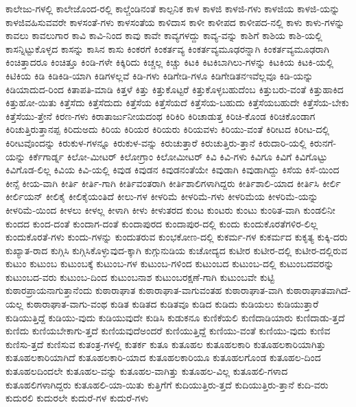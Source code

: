 {ಕಾಲೇಜು-ಗಳಲ್ಲಿ
ಕಾಲೇಜೊಂದ-ರಲ್ಲಿ
ಕಾಲ್ಚೆಂಡಿನಂತೆ
ಕಾಲ್ಪನಿಕ
ಕಾಳ
ಕಾಳಜಿ
ಕಾಳಜಿ-ಗಳು
ಕಾಳಜಿಯ
ಕಾಳಜಿ-ಯನ್ನು
ಕಾಳಜಿವಹಿಸುವವರೇ
ಕಾಳಸಂತೆ-ಗಳು
ಕಾಳಸಂತೆಯ
ಕಾಳಿದಾಸ
ಕಾಳೀ
ಕಾಳೀಪದ
ಕಾಳೀಪದ-ನಲ್ಲಿ
ಕಾಳು
ಕಾಳು-ಗಳನ್ನು
ಕಾವಲು
ಕಾವಲುಗಾರ
ಕಾವಿ
ಕಾವಿ-ನಿಂದ
ಕಾವು
ಕಾವೇ
ಕಾವ್ಯಗಳದ್ದು
ಕಾವ್ಯ-ವನ್ನು
ಕಾಶಿಗೆ
ಕಾಶಿಯ
ಕಾಶಿ-ಯಲ್ಲಿ
ಕಾಸನ್ನಿಟ್ಟುಕೊಳ್ಳದ
ಕಾಸನ್ನು
ಕಾಸಿನ
ಕಾಸು
ಕಿಂಕರಗೆ
ಕಿಂಕರ್ತವ್ಯ
ಕಿಂಕರ್ತವ್ಯಮೂಢರನ್ನಾಗಿ
ಕಿಂಕರ್ತವ್ಯಮೂಢರಾಗಿ
ಕಿಂಚಿತ್ತಾದರೂ
ಕಿಂಚಿತ್ತೂ
ಕಿಂಡಿ-ಗಳೇ
ಕಿಕ್ಕಿರಿದು
ಕಿಚ್ಚಲ್ಲ
ಕಿಚ್ಚು
ಕಿಟಕಿ
ಕಿಟಕಿಬಾಗಿಲು-ಗಳನ್ನು
ಕಿಟಕಿಯ
ಕಿಟಕಿ-ಯಲ್ಲಿ
ಕಿಟಿಕಿಯ
ಕಿಡಿ
ಕಿಡಿಕಿಡಿ-ಯಾಗಿ
ಕಿಡಿಗಳಲ್ಲವೆ
ಕಿಡಿ-ಗಳು
ಕಿಡಿಗೇಡಿ-ಗಳೂ
ಕಿಡಿಗೇಡಿತನಇವೆಲ್ಲವೂ
ಕಿಡಿ-ಯನ್ನು
ಕಿಡಿಯಾದುದ-ರಿಂದ
ಕಿತಾಪತಿ-ಮಾಡಿ
ಕಿತ್ತಳೆ
ಕಿತ್ತು
ಕಿತ್ತುಕೊಟ್ಟರೆ
ಕಿತ್ತುಕೊಳ್ಳಬಹುದೆಂಬ
ಕಿತ್ತುಬರು-ವಂತೆ
ಕಿತ್ತುಹಾಕಿದ
ಕಿತ್ತುಹೋ-ಯಿತು
ಕಿತ್ತೆಸೆದು
ಕಿತ್ತೆಸೆದುದು
ಕಿತ್ತೆಸೆಯ
ಕಿತ್ತೆಸೆಯದೆ
ಕಿತ್ತೆಸೆಯ-ಬಹುದು
ಕಿತ್ತೆಸೆಯಬಹುದೇ
ಕಿತ್ತೆಸೆಯ-ಬೇಕು
ಕಿತ್ತೆಸೆಯು-ತ್ತೇನೆ
ಕಿರಣ-ಗಳು
ಕಿರಾತಾರ್ಜುನೀಯದಂಥ
ಕಿರಿಕಿರಿ
ಕಿರಿಚಾಡುತ್ತ
ಕಿರಿಚಿ-ಕೊಂಡ
ಕಿರಿಚಿಕೊಂಡಾಗ
ಕಿರಿಚುತ್ತಿರುತ್ತಾನಪ್ಪ
ಕಿರಿದುಅದು
ಕಿರಿಯ
ಕಿರಿಯರ
ಕಿರಿಯರು
ಕಿರಿಯವಳು
ಕಿರಿಯು-ವಂತೆ
ಕಿರೀಟದ
ಕಿರೀಟ-ದಲ್ಲಿ
ಕಿರೀಟವೊಂದನ್ನು
ಕಿರುಕುಳ-ಗಳನ್ನೂ
ಕಿರುಕುಳ-ವನ್ನು
ಕಿರುಚುತ್ತಾರೆ
ಕಿರುಚುತ್ತಿರು-ತ್ತಾನೆ
ಕಿರುದಾರಿ-ಯಲ್ಲಿ
ಕಿರುನಗೆ-ಯನ್ನು
ಕಿರ್ಕೆಗಾರ್ಡ್ನ
ಕಿಲೋ-ಮೀಟರ್
ಕಿಲೋಗ್ರಾಂ
ಕಿಲೋಮೀಟರ್
ಕಿವಿ
ಕಿವಿ-ಗಳು
ಕಿವಿಗೂ
ಕಿವಿಗೆ
ಕಿವಿಗೊಟ್ಟು
ಕಿವಿಗೊಡ-ಲಿಲ್ಲ
ಕಿವಿಯ
ಕಿವಿ-ಯಲ್ಲಿ
ಕಿವುಡ
ಕಿವುಡನ
ಕಿವುಡನಂತೆಯೇ
ಕಿವುಡಾಗಿ
ಕಿವುಡಾಗಿದ್ದು
ಕಿಸೆಯ
ಕಿಸೆ-ಯಿಂದ
ಕೀನ್ಸೆ
ಕೀಯ-ವಾಗಿ
ಕೀರ್ತಿ
ಕೀರ್ತಿ-ಗಾಗಿ
ಕೀರ್ತಿವಂತರಾಗಿ
ಕೀರ್ತಿಶಾಲಿಗಳಾಗಿದ್ದರು
ಕೀರ್ತಿಶಾಲಿ-ಯಾದ
ಕೀರ್ತಿಸಿ
ಕೀರ್ಲಿ
ಕೀರ್ಲಿಯನ್
ಕೀಲಿಕೈ
ಕೀಲಿಕೈಯಂತಿದೆ
ಕೀಲು-ಗಳ
ಕೀಳರಿಮೆ
ಕೀಳರಿಮೆ-ಗಳು
ಕೀಳರಿಮೆಯ
ಕೀಳರಿಮೆ-ಯನ್ನು
ಕೀಳರಿಮೆ-ಯಿಂದ
ಕೀಳಲು
ಕೀಳಲ್ಲ
ಕೀಳಾಗಿ
ಕೀಳು
ಕೀಳುತರದ
ಕುಂಟ
ಕುಂಟರು
ಕುಂಟು
ಕುಂಠಿತ-ವಾಗಿ
ಕುಂಡಲಿನೀ
ಕುಂದದ
ಕುಂದ-ದಂತೆ
ಕುಂದಾಗ-ದಂತೆ
ಕುಂದಾಪುರದ
ಕುಂದಾಪುರ-ದಲ್ಲಿ
ಕುಂದು
ಕುಂದುಕೊರತೆಗಳಿರ-ಲಿಲ್ಲ
ಕುಂದುಕೊರತೆ-ಗಳು
ಕುಂದು-ಗಳನ್ನು
ಕುಂದುತರುವ
ಕುಂಭಕೋಣ-ದಲ್ಲಿ
ಕುಕರ್ಮ-ಗಳ
ಕುಕರ್ಮದ
ಕುಕೃತ್ಯ
ಕುಕ್ಕಿ-ದರು
ಕುಖ್ಯಾತ-ರಾದ
ಕುಗ್ಗಿಸಿ
ಕುಗ್ಗಿಸಿಕೊಳ್ಳುವುದ-ಕ್ಕಾಗಿ
ಕುಗ್ಗುನುಡಿಯ
ಕುಚೋದ್ಯದ
ಕುಟೀರ
ಕುಟೀರ-ದಲ್ಲಿ
ಕುಟೀರ-ದಲ್ಲಿರುವ
ಕುಟುಂ
ಕುಟುಂಬ
ಕುಟುಂಬಕ್ಕೆ
ಕುಟುಂಬ-ಗಳ
ಕುಟುಂಬ-ಗಳಿಂದ
ಕುಟುಂಬದ
ಕುಟುಂಬ-ದಲ್ಲಿ
ಕುಟುಂಬದವರನ್ನು
ಕುಟುಂಬದ-ವರು
ಕುಟುಂಬ-ದಿಂದ
ಕುಟುಂಬನಾಶ
ಕುಟುಂಬರಕ್ಷಣೆ-ಗಾಗಿ
ಕುಟುಂಬವೇ
ಕುಟ್ಟಿ
ಕುಠಾರಪ್ರಾಯನಾಗುತ್ತಾನೆಂದು
ಕುಠಾರಾಘಾತ
ಕುಠಾರಾಘಾತ-ವಾಗುವಂತಹ
ಕುಠಾರಾಘಾತ-ವಾಗಿ
ಕುಠಾರಾಘಾತವಾಗಿದೆ-ಯಲ್ಲ
ಕುಠಾರಾಘಾತ-ವಾಗು-ವಂಥ
ಕುಡಿತ
ಕುಡಿತದ
ಕುಡಿತವೂ
ಕುಡಿದ
ಕುಡಿದು
ಕುಡಿಯಲು
ಕುಡಿಯುತ್ತಾರೆ
ಕುಡಿಯುತ್ತಿದ್ದೆ
ಕುಡಿಯು-ವುದು
ಕುಡಿಯುವುದೇ
ಕುಡಿಸಿ
ಕುಡುಕನೂ
ಕುಣಿಕೆಯಲಿ
ಕುಣಿದಾಡಿಯಾರು
ಕುಣಿದಾಡು-ತ್ತದೆ
ಕುಣಿದು
ಕುಣಿಯಬೇಕಾಗು-ತ್ತದೆ
ಕುಣಿಯವುದೆಅಂದರೆ
ಕುಣಿಯುತ್ತಿದ್ದೆ
ಕುಣಿಯು-ವಂತೆ
ಕುಣಿಯು-ವುದು
ಕುಣಿವ
ಕುಣಿಸು-ತ್ತದೆ
ಕುಣಿಸುವ
ಕುತಂತ್ರ-ಗಳಲ್ಲಿ
ಕುತರ್ಕ
ಕುತೂ
ಕುತೂಹಲ
ಕುತೂಹಲಕಾರಿ
ಕುತೂಹಲಕಾರಿಯಾಗಿತ್ತು
ಕುತೂಹಲಕಾರಿಯಾಗಿದೆ
ಕುತೂಹಲಕಾರಿ-ಯಾದ
ಕುತೂಹಲಕಾರಿಯೂ
ಕುತೂಹಲಗೊಂಡ
ಕುತೂಹಲ-ದಿಂದ
ಕುತೂಹಲದಿಂದಲೇ
ಕುತೂಹಲ-ವನ್ನು
ಕುತೂಹಲ-ವಾಗಿತ್ತು
ಕುತೂಹಲ-ವಿಲ್ಲ
ಕುತೂಹಲಿ-ಗಳಾದ
ಕುತೂಹಲಿಗಳಾಗಿದ್ದರು
ಕುತೂಹಲಿ-ಯಾ-ಯಿತು
ಕುತ್ತಿಗೆಗೆ
ಕುದಿಯುತ್ತಿರು-ತ್ತದೆ
ಕುದಿಯುತ್ತಿರು-ತ್ತಾನೆ
ಕುದಿ-ವರು
ಕುದುರಲಿ
ಕುದುರಲೇ
ಕುದುರೆ-ಗಳ
ಕುದುರೆ-ಗಳು
}
